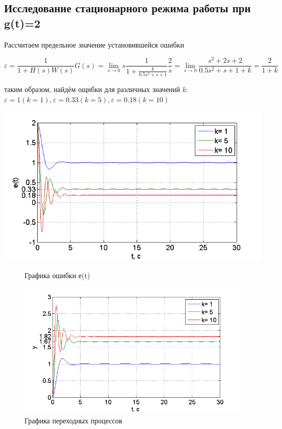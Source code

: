 \documentclass[a4paper, 12pt]{article}
\begin{document}
\subsection{Исследование стационарного режима работы при g(t)=2}\hfill\par
Рассчитаем предельное значение установившейся ошибки

\begin{equation}
\varepsilon  = \frac{1}{{1 + H\left( s \right)W\left( s \right)}}G\left( s \right) = \mathop {\lim }\limits_{s \to 0} s\frac{1}{{1 + \frac{k}{{0.5{s^2} + s + 1}}}}\frac{2}{s} = \mathop {\lim }\limits_{s \to 0} \frac{{{s^2} + 2s + 2}}{{0.5{s^2} + s + 1 + k}} = \frac{2}{{1 + k}}
\end{equation}

таким образом, найдём ощибки для различных значений $k$:
$\varepsilon=1 (k=1), \varepsilon=0.33 (k=5), \varepsilon=0.18 (k=10)$

\begin{center}
	\includegraphics[width=0.7\linewidth]{1}
	\begin{figure}[ht]
	
	\caption{Графика ошибки е(t)}
	\label{fig:1}
	\end{figure}
\end{center}

\begin{figure}[h]
	\centering
	\includegraphics[width=0.7\linewidth]{2}
	\caption{Графика переходных процессов}
	\label{fig:2}
\end{figure}
\end{document}
